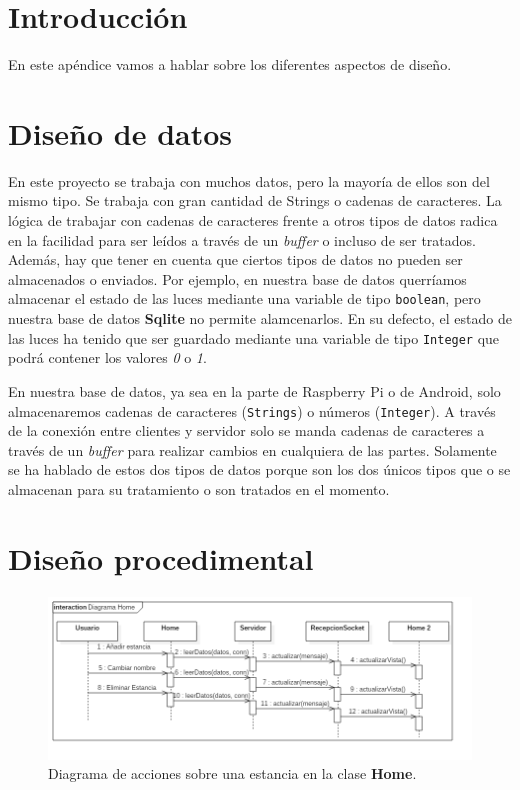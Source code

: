 
\section{Introducción}

En este apéndice vamos a hablar sobre los diferentes aspectos de diseño.

\section{Diseño de datos}

En este proyecto se trabaja con muchos datos, pero la mayoría de ellos son del mismo tipo. Se trabaja con gran cantidad de Strings o cadenas de caracteres. La lógica de trabajar con cadenas de caracteres frente a otros tipos de datos radica en la facilidad para ser leídos a través de un \textit{buffer} o incluso de ser tratados. Además, hay que tener en cuenta que ciertos tipos de datos no pueden ser almacenados o enviados. Por ejemplo, en nuestra base de datos querríamos almacenar el estado de las luces mediante una variable de tipo \verb|boolean|, pero nuestra base de datos \textbf{Sqlite} no permite alamcenarlos. En su defecto, el estado de las luces ha tenido que ser guardado mediante una variable de tipo \verb|Integer| que podrá contener los valores \textit{0} o \textit{1}.

En nuestra base de datos, ya sea en la parte de Raspberry Pi o de Android, solo almacenaremos cadenas de caracteres (\verb|Strings|) o números (\verb|Integer|). A través de la conexión entre clientes y servidor solo se manda cadenas de caracteres a través de un \textit{buffer} para realizar cambios en cualquiera de las partes. Solamente se ha hablado de estos dos tipos de datos porque son los dos únicos tipos que o se almacenan para su tratamiento o son tratados en el momento.

\section{Diseño procedimental}

\begin{figure}[h!]
	\centering
	\includegraphics[width=1.2\linewidth]{img/DiagramaHome}
	\caption{Diagrama de acciones sobre una estancia en la clase \textbf{Home}.}
	\label{fig:DiagramaHome}
\end{figure}

